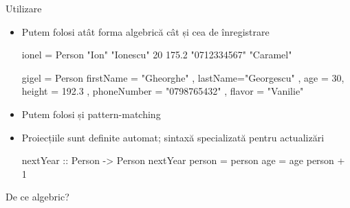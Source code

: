 \documentclass[handout,xcolor=pdftex,romanian,colorlinks]{beamer}
\begin{document}
\begin{frame}[fragile]{Utilizare}
\begin{itemize}
\item Putem folosi atât forma algebrică cât și cea de înregistrare
\begin{asciihs}
ionel = Person "Ion" "Ionescu" 20 175.2 
    "0712334567" "Caramel"

gigel = Person { firstName = "Gheorghe"
               , lastName="Georgescu"
               , age = 30, height = 192.3
               , phoneNumber = "0798765432"
               , flavor = "Vanilie" }
\end{asciihs}
\item Putem folosi și pattern-matching
\item Proiecțiile sunt definite automat; sintaxă specializată pentru actualizări%
\begin{asciihs}
nextYear :: Person -> Person
nextYear person = person { age = age person + 1 }
\end{asciihs}
\end{itemize}
\end{frame}

\begin{frame}{De ce algebric?}
\end{frame}
\end{document}
